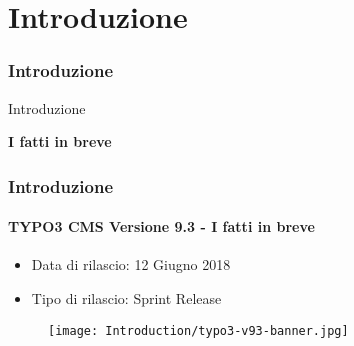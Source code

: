 %

\section{Introduzione}
\begin{frame}[fragile]
	\frametitle{Introduzione}

	\begin{center}\huge{Introduzione}\end{center}
	\begin{center}\huge{\color{typo3darkgrey}\textbf{I fatti in breve}}\end{center}

\end{frame}

\begin{frame}[fragile]
	\frametitle{Introduzione}
	\framesubtitle{TYPO3 CMS Versione 9.3 - I fatti in breve}

	\begin{itemize}
		\item Data di rilascio: 12 Giugno 2018
		\item Tipo di rilascio: Sprint Release
	\end{itemize}

	\begin{figure}
		\texttt{[image: Introduction/typo3-v93-banner.jpg]}
	\end{figure}

\end{frame}

